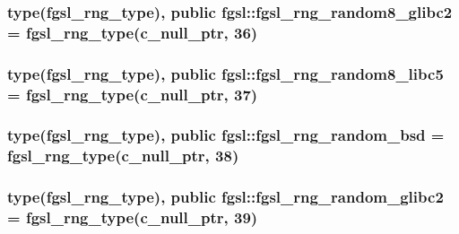 \subsubsection[{fgsl\+\_\+rng\+\_\+random8\+\_\+glibc2}]{\setlength{\rightskip}{0pt plus 5cm}type({\bf fgsl\+\_\+rng\+\_\+type}), public fgsl\+::fgsl\+\_\+rng\+\_\+random8\+\_\+glibc2 = {\bf fgsl\+\_\+rng\+\_\+type}(c\+\_\+null\+\_\+ptr, 36)}\label{namespacefgsl_a6028caefc0e3a940d1ee57801f7fd438}
\hypertarget{namespacefgsl_a2cce36d84f84109ec9e54bd0d252bbb3}{}
\subsubsection[{fgsl\+\_\+rng\+\_\+random8\+\_\+libc5}]{\setlength{\rightskip}{0pt plus 5cm}type({\bf fgsl\+\_\+rng\+\_\+type}), public fgsl\+::fgsl\+\_\+rng\+\_\+random8\+\_\+libc5 = {\bf fgsl\+\_\+rng\+\_\+type}(c\+\_\+null\+\_\+ptr, 37)}\label{namespacefgsl_a2cce36d84f84109ec9e54bd0d252bbb3}
\hypertarget{namespacefgsl_a087022fa0d8a304cfb59e544a14d0a3c}{}
\subsubsection[{fgsl\+\_\+rng\+\_\+random\+\_\+bsd}]{\setlength{\rightskip}{0pt plus 5cm}type({\bf fgsl\+\_\+rng\+\_\+type}), public fgsl\+::fgsl\+\_\+rng\+\_\+random\+\_\+bsd = {\bf fgsl\+\_\+rng\+\_\+type}(c\+\_\+null\+\_\+ptr, 38)}\label{namespacefgsl_a087022fa0d8a304cfb59e544a14d0a3c}
\hypertarget{namespacefgsl_aa5b21e91890ada1ae4bef30981f67da1}{}
\subsubsection[{fgsl\+\_\+rng\+\_\+random\+\_\+glibc2}]{\setlength{\rightskip}{0pt plus 5cm}type({\bf fgsl\+\_\+rng\+\_\+type}), public fgsl\+::fgsl\+\_\+rng\+\_\+random\+\_\+glibc2 = {\bf fgsl\+\_\+rng\+\_\+type}(c\+\_\+null\+\_\+ptr, 39)}\label{namespacefgsl_aa5b21e91890ada1ae4bef30981f67da1}
\hypertarget{namespacefgsl_a642018575871b9b658058f7540ffce03}{}
